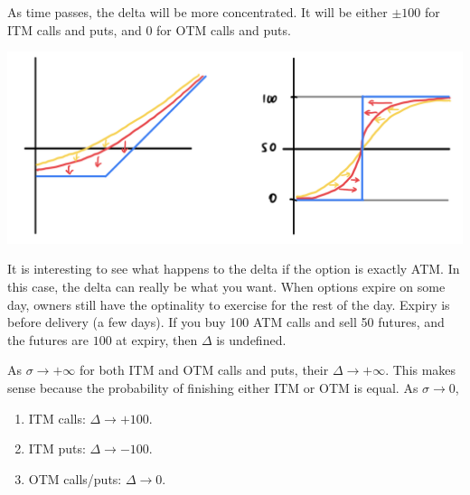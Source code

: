 \documentclass{article}
\begin{document}
    \begin{theorem}
      As time passes, the delta will be more concentrated. It will be either $\pm 100$ for ITM calls and puts, and $0$ for OTM calls and puts.
      \begin{center}
        \includegraphics[scale=0.4]{img/delta_across_time.png}
      \end{center}
    \end{theorem}

    It is interesting to see what happens to the delta if the option is exactly ATM. In this case, the delta can really be what you want. When options expire on some day, owners still have the optinality to exercise for the rest of the day. Expiry is before delivery (a few days). If you buy 100 ATM calls and sell 50 futures, and the futures are $100$ at expiry, then $\Delta$ is undefined.

    \begin{theorem}
      As $\sigma \rightarrow +\infty$ for both ITM and OTM calls and puts, their $\Delta \rightarrow +\infty$. This makes sense because the probability of finishing either ITM or OTM is equal. As $\sigma \rightarrow 0$, 
      \begin{enumerate}
        \item ITM calls: $\Delta \rightarrow +100$. 
        \item ITM puts: $\Delta \rightarrow -100$. 
        \item OTM calls/puts: $\Delta \rightarrow 0$. 
      \end{enumerate}
    \end{theorem}
\end{document}
